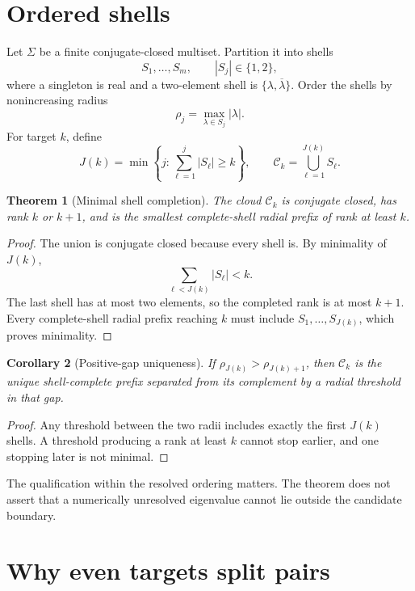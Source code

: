 \documentclass[11pt]{article}
\newtheorem{theorem}{Theorem}[section]
\newtheorem{corollary}[theorem]{Corollary}
\theoremstyle{remark}\newtheorem{remark}[theorem]{Remark}
\begin{document}
\section{Ordered shells}

Let $\Sigma$ be a finite conjugate-closed multiset. Partition it into shells
\[
 S_1,\ldots,S_m,\qquad |S_j|\in\{1,2\},
\]
where a singleton is real and a two-element shell is
$\{\lambda,\overline\lambda\}$. Order the shells by nonincreasing radius
\[
 \rho_j=\max_{\lambda\in S_j}|\lambda|.
\]
For target $k$, define
\begin{equation}\label{eq:index}
 J(k)=\min\left\{j:\sum_{\ell=1}^{j}|S_\ell|\ge k\right\},
 \qquad
 \mathcal C_k=\bigcup_{\ell=1}^{J(k)}S_\ell.
\end{equation}

\begin{theorem}[Minimal shell completion]\label{thm:minimal}
The cloud $\mathcal C_k$ is conjugate closed, has rank $k$ or $k+1$, and is
the smallest complete-shell radial prefix of rank at least $k$.
\end{theorem}
\begin{proof}
The union is conjugate closed because every shell is. By minimality of
$J(k)$,
\[
 \sum_{\ell<J(k)}|S_\ell|<k.
\]
The last shell has at most two elements, so the completed rank is at most
$k+1$. Every complete-shell radial prefix reaching $k$ must include
$S_1,\ldots,S_{J(k)}$, which proves minimality.
\end{proof}

\begin{corollary}[Positive-gap uniqueness]\label{cor:unique}
If $\rho_{J(k)}>\rho_{J(k)+1}$, then $\mathcal C_k$ is the unique
shell-complete prefix separated from its complement by a radial threshold in
that gap.
\end{corollary}
\begin{proof}
Any threshold between the two radii includes exactly the first $J(k)$ shells.
A threshold producing a rank at least $k$ cannot stop earlier, and one stopping
later is not minimal.
\end{proof}

The qualification within the resolved ordering matters. The theorem does
not assert that a numerically unresolved eigenvalue cannot lie outside the
candidate boundary.

\section{Why even targets split pairs}
\end{document}
